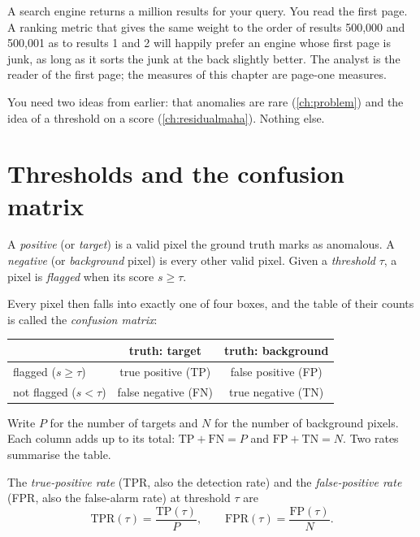 \begin{analogy}
A search engine returns a million results for your query. You read the first page. A ranking metric that gives the
same weight to the order of results 500,000 and 500,001 as to results 1 and 2 will happily prefer an engine whose
first page is junk, as long as it sorts the junk at the back slightly better. The analyst is the reader of the
first page; the measures of this chapter are page-one measures.
\end{analogy}

You need two ideas from earlier: that anomalies are rare (\cref{ch:problem}) and the idea of a threshold on a
score (\cref{ch:residualmaha}). Nothing else.

\section{Thresholds and the confusion matrix}\label{sec:measures:confusion}

\begin{definition}
A \emph{positive} (or \emph{target}) is a valid pixel the ground truth marks as anomalous. A
\emph{negative} (or \emph{background} pixel) is every other valid pixel. Given a
\emph{threshold} $\tau$, a pixel is \emph{flagged} when its score $s \ge \tau$.
\end{definition}

Every pixel then falls into exactly one of four boxes, and the table of their counts is called the
\emph{confusion matrix}:

\begin{center}
\begin{tabular}{lcc}
\toprule
 & truth: target & truth: background \\
\midrule
flagged ($s \ge \tau$) & true positive (TP) & false positive (FP) \\
not flagged ($s < \tau$) & false negative (FN) & true negative (TN) \\
\bottomrule
\end{tabular}
\end{center}

Write $P$ for the number of targets and $N$ for the number of background pixels. Each column adds up to its total:
$\mathrm{TP} + \mathrm{FN} = P$ and $\mathrm{FP} + \mathrm{TN} = N$. Two rates summarise the table.

\begin{definition}
The \emph{true-positive rate} (TPR, also the detection rate) and the
\emph{false-positive rate} (FPR, also the false-alarm rate) at threshold $\tau$ are
\begin{equation}\label{eq:measures:rates}
\mathrm{TPR}(\tau) = \frac{\mathrm{TP}(\tau)}{P}, \qquad \mathrm{FPR}(\tau) = \frac{\mathrm{FP}(\tau)}{N}.
\end{equation}
\end{definition}

